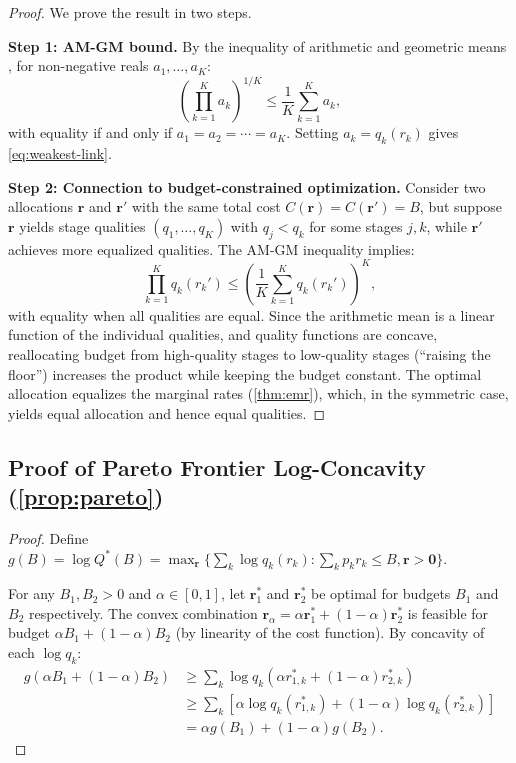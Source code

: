 \documentclass[11pt, a4paper, logo, copyright]{googledeepmind}
\begin{document}
\begin{appendices}
\begin{proof}
We prove the result in two steps.

\textbf{Step 1: AM-GM bound.} By the inequality of arithmetic and geometric means \citep{hardy1952}, for non-negative reals $a_1, \ldots, a_K$:
\[
    \left(\prod_{k=1}^K a_k\right)^{1/K} \leq \frac{1}{K}\sum_{k=1}^K a_k,
\]
with equality if and only if $a_1 = a_2 = \cdots = a_K$. Setting $a_k = q_k(r_k)$ gives \cref{eq:weakest-link}.

\textbf{Step 2: Connection to budget-constrained optimization.} Consider two allocations $\mathbf{r}$ and $\mathbf{r}'$ with the same total cost $C(\mathbf{r}) = C(\mathbf{r}') = B$, but suppose $\mathbf{r}$ yields stage qualities $(q_1, \ldots, q_K)$ with $q_j < q_k$ for some stages $j, k$, while $\mathbf{r}'$ achieves more equalized qualities. The AM-GM inequality implies:
\[
    \prod_{k=1}^K q_k(r_k') \leq \left(\frac{1}{K}\sum_{k=1}^K q_k(r_k')\right)^K,
\]
with equality when all qualities are equal. Since the arithmetic mean is a linear function of the individual qualities, and quality functions are concave, reallocating budget from high-quality stages to low-quality stages (``raising the floor'') increases the product while keeping the budget constant. The optimal allocation equalizes the marginal rates (\cref{thm:emr}), which, in the symmetric case, yields equal allocation and hence equal qualities.
\end{proof}

\subsection{Proof of Pareto Frontier Log-Concavity (\texorpdfstring{\cref{prop:pareto}}{Proposition 3.8})}

\begin{proof}
Define $g(B) = \log Q^*(B) = \max_{\mathbf{r}} \{\sum_k \log q_k(r_k) : \sum_k p_k r_k \leq B, \mathbf{r} > \mathbf{0}\}$.

For any $B_1, B_2 > 0$ and $\alpha \in [0,1]$, let $\mathbf{r}_1^*$ and $\mathbf{r}_2^*$ be optimal for budgets $B_1$ and $B_2$ respectively. The convex combination $\mathbf{r}_\alpha = \alpha \mathbf{r}_1^* + (1-\alpha)\mathbf{r}_2^*$ is feasible for budget $\alpha B_1 + (1-\alpha)B_2$ (by linearity of the cost function). By concavity of each $\log q_k$:
\begin{align*}
    g(\alpha B_1 + (1-\alpha)B_2) &\geq \sum_k \log q_k(\alpha r_{1,k}^* + (1-\alpha)r_{2,k}^*) \\
    &\geq \sum_k \left[\alpha \log q_k(r_{1,k}^*) + (1-\alpha)\log q_k(r_{2,k}^*)\right] \\
    &= \alpha g(B_1) + (1-\alpha) g(B_2).
\end{align*}


\end{proof}
\end{appendices}
\end{document}
